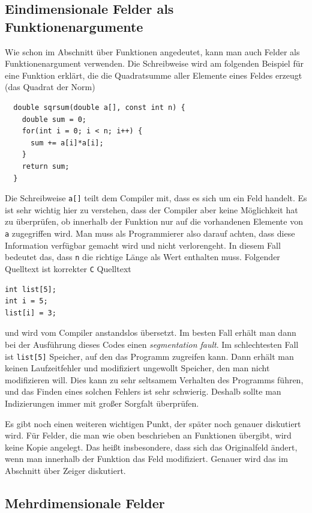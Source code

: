 \subsection{Eindimensionale Felder als Funktionenargumente}

Wie schon im Abschnitt über Funktionen angedeutet, kann man auch Felder als Funktionenargument verwenden.
Die Schreibweise wird am folgenden Beispiel für eine Funktion erklärt, die die Quadratsumme aller Elemente eines Feldes erzeugt (das Quadrat der Norm)
\begin{lstlisting}
  double sqrsum(double a[], const int n) {
    double sum = 0;
    for(int i = 0; i < n; i++) {
      sum += a[i]*a[i];
    }
    return sum;
  }
\end{lstlisting}
Die Schreibweise \texttt{a[]} teilt dem Compiler mit, dass es sich um ein Feld handelt.
Es ist sehr wichtig hier zu verstehen, dass der Compiler aber keine Möglichkeit hat zu überprüfen, ob innerhalb der Funktion nur auf die vorhandenen Elemente von \texttt{a} zugegriffen wird.
Man muss als Programmierer also darauf achten, dass diese Information verfügbar gemacht wird und nicht verlorengeht.
In diesem Fall bedeutet das, dass \texttt{n} die richtige Länge als Wert enthalten muss.
Folgender Quelltext ist korrekter \texttt{C} Quelltext
\begin{lstlisting}
int list[5];
int i = 5;
list[i] = 3;
\end{lstlisting}
und wird vom Compiler anstandslos übersetzt.
Im besten Fall erhält man dann bei der Ausführung dieses Codes einen \emph{segmentation fault}.
Im schlechtesten Fall ist \verb|list[5]| Speicher, auf den das Programm zugreifen kann.
Dann erhält man keinen Laufzeitfehler und modifiziert ungewollt Speicher, den man nicht modifizieren will.
Dies kann zu sehr seltsamem Verhalten des Programms führen, und das Finden eines solchen Fehlers ist sehr schwierig.
Deshalb sollte man Indizierungen immer mit großer Sorgfalt überprüfen.

Es gibt noch einen weiteren wichtigen Punkt, der später noch genauer diskutiert wird.
Für Felder, die man wie oben beschrieben an Funktionen übergibt, wird keine Kopie angelegt.
Das heißt insbesondere, dass sich das Originalfeld ändert, wenn man innerhalb der Funktion das Feld modifiziert.
Genauer wird das im Abschnitt über Zeiger diskutiert.

\subsection{Mehrdimensionale Felder}

